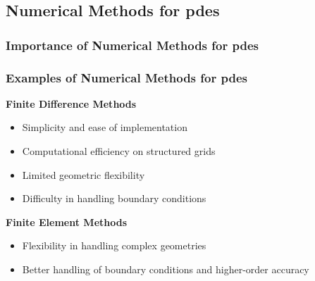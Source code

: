 \subsection{Numerical Methods for \texorpdfstring{\acrlong{pdes}}{}}

\begin{frame}
    \frametitle{Importance of Numerical Methods for \acrshort{pdes}}

    
\end{frame}

\begin{frame}
    \frametitle{Examples of Numerical Methods for \acrshort{pdes}}

    \vspace*{\fill}
    \begin{multicols}{2}

        \begin{center}
            {\color{\accentcolor} \Large \textbf{Finite Difference Methods}}
            \vspace*{0.5cm}

            \begin{itemize}
                \color{\procolor}
                \item Simplicity and ease of implementation
                \item Computational efficiency on structured grids
            \end{itemize}

            \begin{itemize}
                \color{\concolor}
                \item Limited geometric flexibility
                \item Difficulty in handling boundary conditions
            \end{itemize}
        \end{center}

        \begin{center}
            {\color{\accentcolor} \Large \textbf{Finite Element Methods}}
            \vspace*{0.5cm}

            \begin{itemize}
                \color{\procolor}
                \item Flexibility in handling complex geometries
                \item Better handling of boundary conditions and higher-order accuracy
            \end{itemize}


\end{center}
\end{multicols}
\end{frame}
